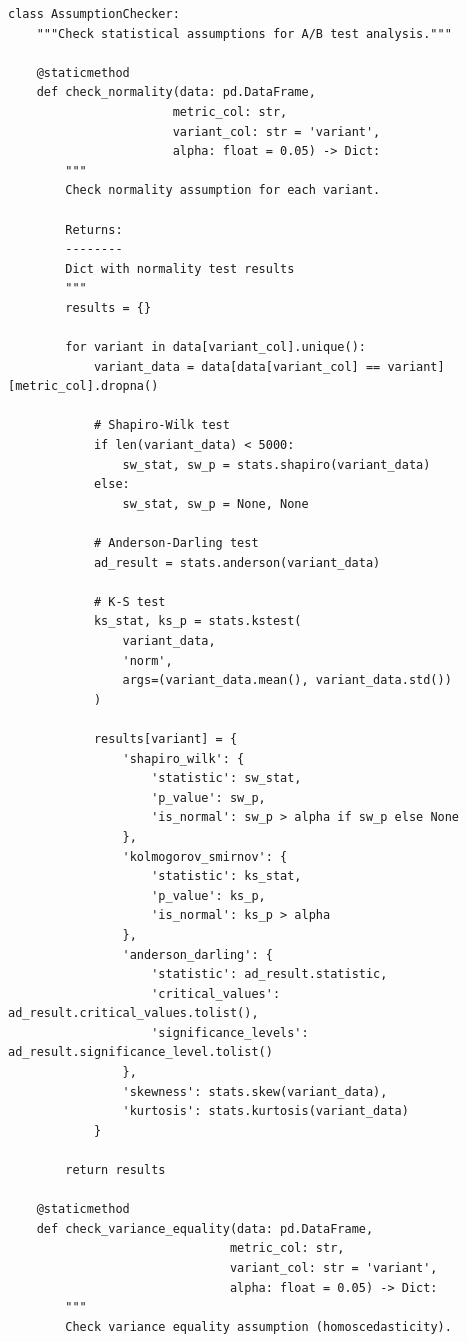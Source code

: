 \lstset{language=Python, caption=Statistical Assumption Checking}
\begin{lstlisting}
class AssumptionChecker:
    """Check statistical assumptions for A/B test analysis."""

    @staticmethod
    def check_normality(data: pd.DataFrame,
                       metric_col: str,
                       variant_col: str = 'variant',
                       alpha: float = 0.05) -> Dict:
        """
        Check normality assumption for each variant.

        Returns:
        --------
        Dict with normality test results
        """
        results = {}

        for variant in data[variant_col].unique():
            variant_data = data[data[variant_col] == variant][metric_col].dropna()

            # Shapiro-Wilk test
            if len(variant_data) < 5000:
                sw_stat, sw_p = stats.shapiro(variant_data)
            else:
                sw_stat, sw_p = None, None

            # Anderson-Darling test
            ad_result = stats.anderson(variant_data)

            # K-S test
            ks_stat, ks_p = stats.kstest(
                variant_data,
                'norm',
                args=(variant_data.mean(), variant_data.std())
            )

            results[variant] = {
                'shapiro_wilk': {
                    'statistic': sw_stat,
                    'p_value': sw_p,
                    'is_normal': sw_p > alpha if sw_p else None
                },
                'kolmogorov_smirnov': {
                    'statistic': ks_stat,
                    'p_value': ks_p,
                    'is_normal': ks_p > alpha
                },
                'anderson_darling': {
                    'statistic': ad_result.statistic,
                    'critical_values': ad_result.critical_values.tolist(),
                    'significance_levels': ad_result.significance_level.tolist()
                },
                'skewness': stats.skew(variant_data),
                'kurtosis': stats.kurtosis(variant_data)
            }

        return results

    @staticmethod
    def check_variance_equality(data: pd.DataFrame,
                               metric_col: str,
                               variant_col: str = 'variant',
                               alpha: float = 0.05) -> Dict:
        """
        Check variance equality assumption (homoscedasticity).


\end{lstlisting}
